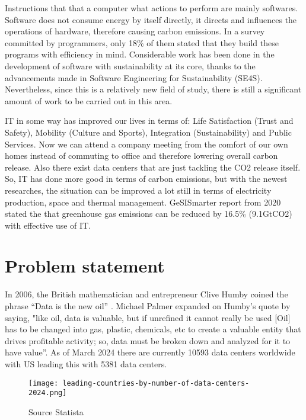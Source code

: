 \documentclass[
  a4paper,  %
  twoside,  %
  bibliography=totoc,
  headsepline,
  cleardoublepage=empty,
  parskip=half,
  draft=false
]{scrbook}
\begin{document}
Instructions that that a computer what actions to perform are mainly softwares\cite{Britannica_2024}. Software does not consume energy by itself directly, it directs and influences the operations of hardware, therefore causing carbon emissions. In a survey committed by programmers, only 18\% of them stated that they build these programs with efficiency in mind. Considerable work has been done in the development of software with sustainability at its core, thanks to the advancements made in Software Engineering for Sustainability (SE4S). Nevertheless, since this is a relatively new field of study, there is still a significant amount of work to be carried out in this area.


IT in some way has improved our lives in terms of: Life Satisfaction (Trust and Safety), Mobility (Culture and Sports), Integration (Sustainability) and Public Services\cite{nevado2019improving}. Now we can attend a company meeting from the comfort of our own homes instead of commuting to office and therefore lowering overall carbon release. Also there exist data centers that are just tackling the CO2 release itself. So, IT has done more good in terms of carbon emissions, but with the newest researches, the situation can be improved a lot still in terms of electricity production, space and thermal management. GeSISmarter report from 2020 stated the that greenhouse gas emissions can be reduced by 16.5\% (9.1GtCO2) with effective use of IT\cite{cosar2019carbon}. 


\section{Problem statement}

In 2006, the British mathematician and entrepreneur Clive Humby coined the phrase “Data is the new oil” \cite{humby2006data}. Michael Palmer expanded on Humby's quote by saying, "like oil, data is valuable, but if unrefined it cannot really be used [Oil] has to be changed into gas, plastic, chemicals, etc to create a valuable entity that drives profitable activity; so, data must be broken down and analyzed for it to have value”\cite{palmer2006}. As of March 2024 there are currently 10593 data centers worldwide with US leading this with 5381 data centers\cite{statista_2024}. 

\begin{figure}
	\centering
	\texttt{[image: leading-countries-by-number-of-data-centers-2024.png]}
	\caption{Source Statista\cite{statista_2024}}
\end{figure}
\end{document}
